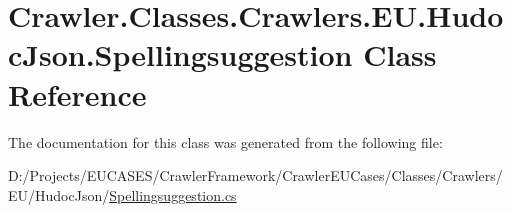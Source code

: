 \hypertarget{class_crawler_1_1_classes_1_1_crawlers_1_1_e_u_1_1_hudoc_json_1_1_spellingsuggestion}{\section{Crawler.\-Classes.\-Crawlers.\-E\-U.\-Hudoc\-Json.\-Spellingsuggestion Class Reference}
\label{class_crawler_1_1_classes_1_1_crawlers_1_1_e_u_1_1_hudoc_json_1_1_spellingsuggestion}
}


The documentation for this class was generated from the following file\-:\begin{DoxyCompactItemize}
\item 
D\-:/\-Projects/\-E\-U\-C\-A\-S\-E\-S/\-Crawler\-Framework/\-Crawler\-E\-U\-Cases/\-Classes/\-Crawlers/\-E\-U/\-Hudoc\-Json/\hyperlink{_spellingsuggestion_8cs}{Spellingsuggestion.\-cs}\end{DoxyCompactItemize}
